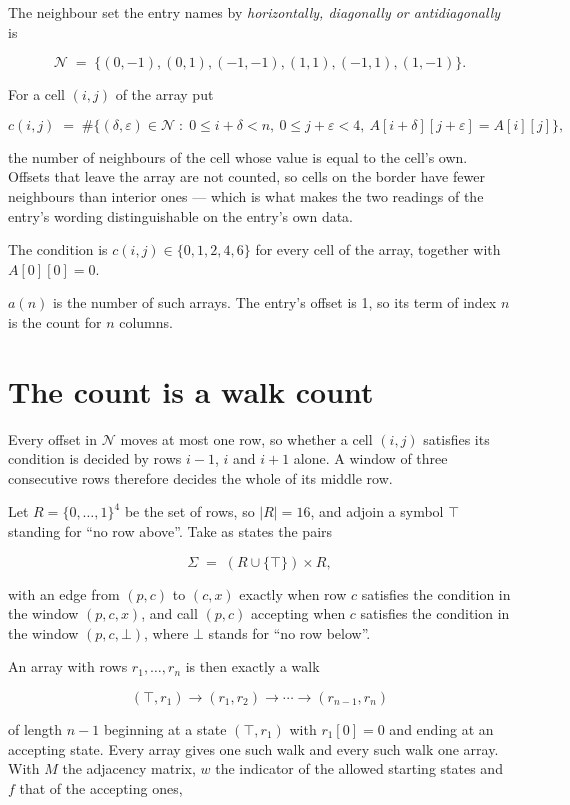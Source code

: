 \documentclass[11pt]{article}
\theoremstyle{definition}
\begin{document}
The neighbour set the entry names by {\itshape horizontally, diagonally or antidiagonally} is

\[\mathcal{N} \;=\; \{(0,-1), (0,1), (-1,-1), (1,1), (-1,1), (1,-1)\}.\]

For a cell $(i,j)$ of the array put

\[c(i,j) \;=\; \#\bigl\{(\delta,\varepsilon)\in\mathcal{N} \;:\; 0\le i+\delta<n,\ 0\le j+\varepsilon<4,\ A[i+\delta][j+\varepsilon] = A[i][j]\bigr\},\]

the number of neighbours of the cell whose value is equal to the cell's own. Offsets that leave the array are not counted, so cells on the border have fewer neighbours than interior ones --- which is what makes the two readings of the entry's wording distinguishable on the entry's own data.

The condition is $c(i,j) \in \{0, 1, 2, 4, 6\}$ for every cell of the array, together with $A[0][0]=0$.

$a(n)$ is the number of such arrays. The entry's offset is 1, so its term of index $n$ is the count for $n$ columns.

\section{The count is a walk count}

Every offset in $\mathcal{N}$ moves at most one row, so whether a cell $(i,j)$ satisfies its condition is decided by rows $i-1$, $i$ and $i+1$ alone. A window of three consecutive rows therefore decides the whole of its middle row.

Let $R = \{0,\dots,1\}^{4}$ be the set of rows, so $|R| = 16$, and adjoin a symbol $\top$ standing for ``no row above''. Take as states the pairs

\[\Sigma \;=\; (R \cup \{\top\}) \times R,\]

with an edge from $(p,c)$ to $(c,x)$ exactly when row $c$ satisfies the condition in the window $(p,c,x)$, and call $(p,c)$ accepting when $c$ satisfies the condition in the window $(p,c,\bot)$, where $\bot$ stands for ``no row below''.

An array with rows $r_1,\dots,r_n$ is then exactly a walk

\[(\top,r_1) \to (r_1,r_2) \to \cdots \to (r_{n-1},r_n)\]

of length $n-1$ beginning at a state $(\top,r_1)$ with $r_1[0]=0$ and ending at an accepting state. Every array gives one such walk and every such walk one array. With $M$ the adjacency matrix, $w$ the indicator of the allowed starting states and $f$ that of the accepting ones,
\end{document}
